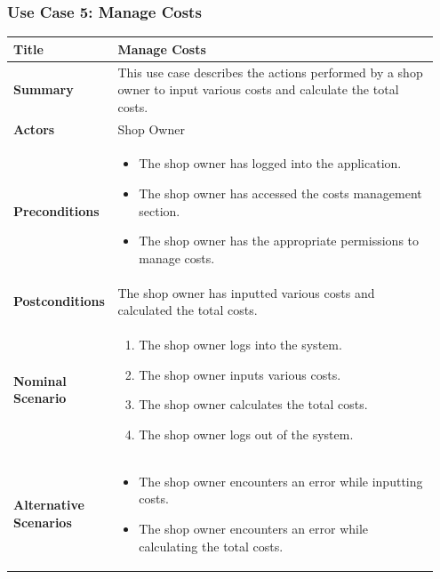 \subsubsection{Use Case 5: Manage Costs}
\begin{longtable}{|p{0.2\linewidth}|p{0.75\linewidth}|}
\hline
\textbf{Title} & Manage Costs \\
\hline
\textbf{Summary} & This use case describes the actions performed by a shop owner to input various costs and calculate the total costs. \\
\hline
\textbf{Actors} & Shop Owner \\
\hline
\textbf{Preconditions} & 
\begin{itemize}
    \item The shop owner has logged into the application.
    \item The shop owner has accessed the costs management section.
    \item The shop owner has the appropriate permissions to manage costs.
\end{itemize} \\
\hline
\textbf{Postconditions} & The shop owner has inputted various costs and calculated the total costs. \\
\hline
\textbf{Nominal Scenario} &
\begin{enumerate}
    \item The shop owner logs into the system.
    \item The shop owner inputs various costs.
    \item The shop owner calculates the total costs.
    \item The shop owner logs out of the system.
\end{enumerate} \\
\hline
\textbf{Alternative Scenarios} &
\begin{itemize}
    \item The shop owner encounters an error while inputting costs.
    \item The shop owner encounters an error while calculating the total costs.
\end{itemize} \\
\hline
\end{longtable}


